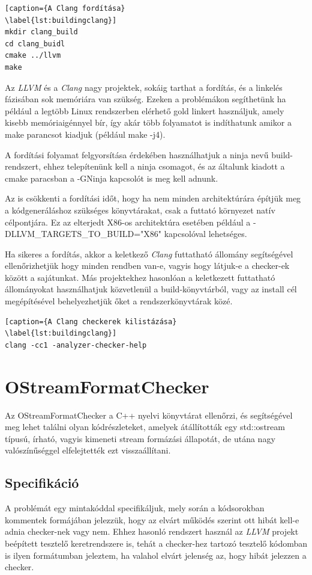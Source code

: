 \documentclass[a4paper,12pt]{report}
\begin{document}
\begin{lstlisting}[caption={A Clang fordítása}
\label{lst:buildingclang}]
mkdir clang_build
cd clang_buidl
cmake ../llvm
make
\end{lstlisting}

Az \emph{LLVM} és a \emph{Clang} nagy projektek, sokáig tarthat a fordítás, és a linkelés fázisában sok memóriára van szükség. Ezeken a problémákon segíthetünk ha például a legtöbb Linux rendszerben elérhető gold linkert használjuk, amely kisebb memóriaigénnyel bír, így akár több folyamatot is indíthatunk amikor a make parancsot kiadjuk (például make -j4).

A fordítási folyamat felgyorsítása érdekében használhatjuk a ninja nevű build-rendszert, ehhez telepítenünk kell a ninja csomagot, és az általunk kiadott a cmake paracsban a -GNinja kapcsolót is meg kell adnunk.

Az is csökkenti a fordítási időt, hogy ha nem minden architektúrára építjük meg a kódgeneráláshoz szükséges könyvtárakat, csak a futtató környezet natív célpontjára. Ez az elterjedt X86-os architektúra esetében például a -DLLVM\_TARGETS\_TO\_BUILD="X86" kapcsolóval lehetséges.

Ha sikeres a fordítás, akkor a keletkező \emph{Clang} futtatható állomány segítségével ellenőrizhetjük hogy minden rendben van-e, vagyis hogy látjuk-e a checker-ek között a sajátunkat. Más projektekhez hasonlóan a keletkezett futtatható állományokat használhatjuk közvetlenül a build-könyvtárból, vagy az install cél megépítésével behelyezhetjük őket a rendszerkönyvtárak közé.

\begin{lstlisting}[caption={A Clang checkerek kilistázása}
\label{lst:buildingclang}]
clang -cc1 -analyzer-checker-help
\end{lstlisting}

\section{OStreamFormatChecker}
Az OStreamFormatChecker a C++ nyelvi könyvtárat ellenőrzi, és segítségével meg lehet találni olyan kódrészleteket, amelyek átállították egy std::ostream típusú, írható, vagyis kimeneti stream formázási állapotát, de utána nagy valószínűséggel elfelejtették ezt visszaállítani.

\subsection{Specifikáció}
A problémát egy mintakóddal specifikáljuk, mely során a kódsorokban kommentek formájában jelezzük, hogy az elvárt működés szerint ott hibát kell-e adnia checker-nek vagy nem. Ehhez hasonló rendszert használ az \emph{LLVM} projekt beépített tesztelő keretrendszere is, tehát a checker-hez tartozó tesztelő kódomban is ilyen formátumban jeleztem, ha valahol elvárt jelenség az, hogy hibát jelezzen a checker.
\end{document}
